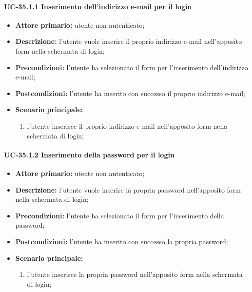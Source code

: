 \paragraph{UC-35.1.1 Inserimento dell'indirizzo e-mail per il login}

	\begin{itemize}
		\item \textbf{Attore primario:} utente non autenticato;

		\item \textbf{Descrizione:} l'utente vuole inserire il proprio indirizzo e-mail nell'apposito form nella schermata di login;

		\item \textbf{Precondizioni:} l'utente ha selezionato il form per l'inserimento dell'indirizzo e-mail;

		\item \textbf{Postcondizioni:} l'utente ha inserito con successo il proprio indirizzo e-mail;

		\item \textbf{Scenario principale:}
	  		\begin{enumerate}
		  		\item l'utente inserisce il proprio indirizzo e-mail nell'apposito form nella schermata di login; 
	  		\end{enumerate}
	\end{itemize}

\paragraph{UC-35.1.2 Inserimento della password per il login}

	\begin{itemize}
		\item \textbf{Attore primario:} utente non autenticato;

		\item \textbf{Descrizione:} l'utente vuole inserire la propria password nell'apposito form nella schermata di login;

		\item \textbf{Precondizioni:} l'utente ha selezionato il form per l'inserimento della password;

		\item \textbf{Postcondizioni:} l'utente ha inserito con successo la propria password;

		\item \textbf{Scenario principale:}
	  		\begin{enumerate}
			  \item l'utente inserisce la propria password nell'apposito form nella schermata di login; 
	  		\end{enumerate}
	\end{itemize}

